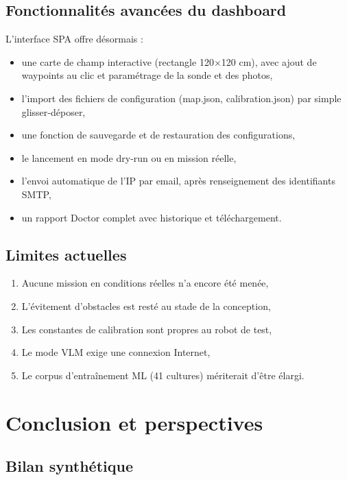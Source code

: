 \documentclass[a4paper,12pt,openany,titlepage]{scrartcl}
\begin{document}
\subsection{Fonctionnalités avancées du dashboard}
L’interface SPA offre désormais :
\begin{itemize}[nosep]
    \item une carte de champ interactive (rectangle 120$\times$120 cm), avec ajout de waypoints au clic et paramétrage de la sonde et des photos,
    \item l’import des fichiers de configuration (map.json, calibration.json) par simple glisser‑déposer,
    \item une fonction de sauvegarde et de restauration des configurations,
    \item le lancement en mode dry‑run ou en mission réelle,
    \item l’envoi automatique de l’IP par email, après renseignement des identifiants SMTP,
    \item un rapport Doctor complet avec historique et téléchargement.
\end{itemize}

\subsection{Limites actuelles}
\begin{enumerate}[nosep]
    \item Aucune mission en conditions réelles n’a encore été menée,
    \item L’évitement d’obstacles est resté au stade de la conception,
    \item Les constantes de calibration sont propres au robot de test,
    \item Le mode VLM exige une connexion Internet,
    \item Le corpus d’entraînement ML (41 cultures) mériterait d’être élargi.
\end{enumerate}

\newpage

\section{Conclusion et perspectives}

\subsection{Bilan synthétique}
\end{document}
